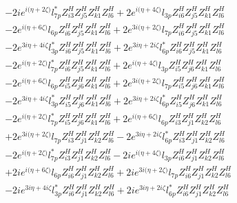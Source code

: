  \begin{align} 
 & -2 i e^{i \Big(\eta +2 \zeta \Big)} l_{7p}^* Z_{{i 3}}^{H} Z_{{j 5}}^{H} Z_{{k 1}}^{H} Z_{{l 6}}^{H} +2 e^{i \Big(\eta +4 \zeta \Big)} l_{3p} Z_{{i 6}}^{H} Z_{{j 5}}^{H} Z_{{k 1}}^{H} Z_{{l 6}}^{H} \nonumber \\ 
 &-2 e^{i \Big(\eta +6 \zeta \Big)} l_{6p} Z_{{i 6}}^{H} Z_{{j 5}}^{H} Z_{{k 1}}^{H} Z_{{l 6}}^{H} +2 e^{3 i \Big(\eta +2 \zeta \Big)} l_{7p} Z_{{i 6}}^{H} Z_{{j 5}}^{H} Z_{{k 1}}^{H} Z_{{l 6}}^{H} \nonumber \\ 
 &-2 e^{3 i \eta +4 i \zeta } l_{3p}^* Z_{{i 6}}^{H} Z_{{j 5}}^{H} Z_{{k 1}}^{H} Z_{{l 6}}^{H} +2 e^{3 i \eta +2 i \zeta } l_{6p}^* Z_{{i 6}}^{H} Z_{{j 5}}^{H} Z_{{k 1}}^{H} Z_{{l 6}}^{H} \nonumber \\ 
 &-2 e^{i \Big(\eta +2 \zeta \Big)} l_{7p}^* Z_{{i 6}}^{H} Z_{{j 5}}^{H} Z_{{k 1}}^{H} Z_{{l 6}}^{H} +2 e^{i \Big(\eta +4 \zeta \Big)} l_{3p} Z_{{i 5}}^{H} Z_{{j 6}}^{H} Z_{{k 1}}^{H} Z_{{l 6}}^{H} \nonumber \\ 
 &-2 e^{i \Big(\eta +6 \zeta \Big)} l_{6p} Z_{{i 5}}^{H} Z_{{j 6}}^{H} Z_{{k 1}}^{H} Z_{{l 6}}^{H} +2 e^{3 i \Big(\eta +2 \zeta \Big)} l_{7p} Z_{{i 5}}^{H} Z_{{j 6}}^{H} Z_{{k 1}}^{H} Z_{{l 6}}^{H} \nonumber \\ 
 &-2 e^{3 i \eta +4 i \zeta } l_{3p}^* Z_{{i 5}}^{H} Z_{{j 6}}^{H} Z_{{k 1}}^{H} Z_{{l 6}}^{H} +2 e^{3 i \eta +2 i \zeta } l_{6p}^* Z_{{i 5}}^{H} Z_{{j 6}}^{H} Z_{{k 1}}^{H} Z_{{l 6}}^{H} \nonumber \\ 
 &-2 e^{i \Big(\eta +2 \zeta \Big)} l_{7p}^* Z_{{i 5}}^{H} Z_{{j 6}}^{H} Z_{{k 1}}^{H} Z_{{l 6}}^{H} +2 e^{i \Big(\eta +6 \zeta \Big)} l_{6p} Z_{{i 3}}^{H} Z_{{j 1}}^{H} Z_{{k 2}}^{H} Z_{{l 6}}^{H} \nonumber \\ 
 &+2 e^{3 i \Big(\eta +2 \zeta \Big)} l_{7p} Z_{{i 3}}^{H} Z_{{j 1}}^{H} Z_{{k 2}}^{H} Z_{{l 6}}^{H} -2 e^{3 i \eta +2 i \zeta } l_{6p}^* Z_{{i 3}}^{H} Z_{{j 1}}^{H} Z_{{k 2}}^{H} Z_{{l 6}}^{H} \nonumber \\ 
 &-2 e^{i \Big(\eta +2 \zeta \Big)} l_{7p}^* Z_{{i 3}}^{H} Z_{{j 1}}^{H} Z_{{k 2}}^{H} Z_{{l 6}}^{H} -2 i e^{i \Big(\eta +4 \zeta \Big)} l_{3p} Z_{{i 6}}^{H} Z_{{j 1}}^{H} Z_{{k 2}}^{H} Z_{{l 6}}^{H} \nonumber \\ 
 &+2 i e^{i \Big(\eta +6 \zeta \Big)} l_{6p} Z_{{i 6}}^{H} Z_{{j 1}}^{H} Z_{{k 2}}^{H} Z_{{l 6}}^{H} +2 i e^{3 i \Big(\eta +2 \zeta \Big)} l_{7p} Z_{{i 6}}^{H} Z_{{j 1}}^{H} Z_{{k 2}}^{H} Z_{{l 6}}^{H} \nonumber \\ 
 &-2 i e^{3 i \eta +4 i \zeta } l_{3p}^* Z_{{i 6}}^{H} Z_{{j 1}}^{H} Z_{{k 2}}^{H} Z_{{l 6}}^{H} +2 i e^{3 i \eta +2 i \zeta } l_{6p}^* Z_{{i 6}}^{H} Z_{{j 1}}^{H} Z_{{k 2}}^{H} Z_{{l 6}}^{H} \nonumber \\ 

\end{align}
